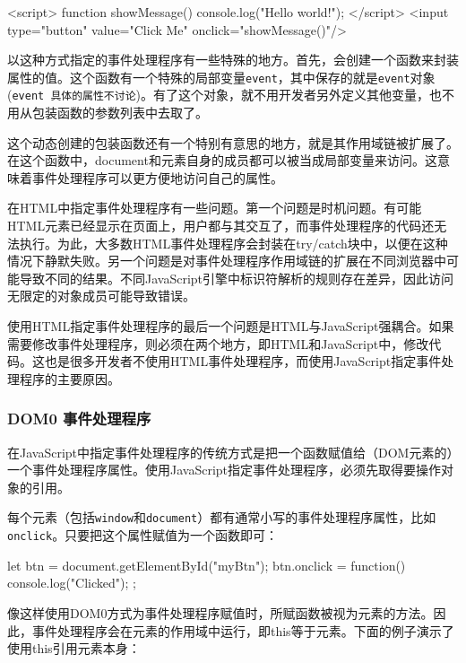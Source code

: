 \begin{JavaScript}
<script>   
    function showMessage() {      
        console.log("Hello world!");   
    }  
</script> 
<input type="button" value="Click Me" onclick="showMessage()"/> 
\end{JavaScript}

以这种方式指定的事件处理程序有一些特殊的地方。首先，会创建一个函数来封装属性的值。这个函数有一个特殊的局部变量\texttt{event}，其中保存的就是\texttt{event}对象(\texttt{event 具体的属性不讨论})。有了这个对象，就不用开发者另外定义其他变量，也不用从包装函数的参数列表中去取了。

这个动态创建的包装函数还有一个特别有意思的地方，就是其作用域链被扩展了。在这个函数中，document和元素自身的成员都可以被当成局部变量来访问。这意味着事件处理程序可以更方便地访问自己的属性。

在HTML中指定事件处理程序有一些问题。第一个问题是时机问题。有可能HTML元素已经显示在页面上，用户都与其交互了，而事件处理程序的代码还无法执行。为此，大多数HTML事件处理程序会封装在try/catch块中，以便在这种情况下静默失败。另一个问题是对事件处理程序作用域链的扩展在不同浏览器中可能导致不同的结果。不同JavaScript引擎中标识符解析的规则存在差异，因此访问无限定的对象成员可能导致错误。

使用HTML指定事件处理程序的最后一个问题是HTML与JavaScript强耦合。如果需要修改事件处理程序，则必须在两个地方，即HTML和JavaScript中，修改代码。这也是很多开发者不使用HTML事件处理程序，而使用JavaScript指定事件处理程序的主要原因。

\subsubsection*{DOM0 事件处理程序}

在JavaScript中指定事件处理程序的传统方式是把一个函数赋值给（DOM元素的）一个事件处理程序属性。使用JavaScript指定事件处理程序，必须先取得要操作对象的引用。

每个元素（包括\texttt{window}和\texttt{document}）都有通常小写的事件处理程序属性，比如\texttt{onclick}。只要把这个属性赋值为一个函数即可：

\begin{JavaScript}
let btn = document.getElementById("myBtn"); 
btn.onclick = function() {    
    console.log("Clicked");  
}; 
\end{JavaScript}

像这样使用DOM0方式为事件处理程序赋值时，所赋函数被视为元素的方法。因此，事件处理程序会在元素的作用域中运行，即this等于元素。下面的例子演示了使用this引用元素本身：

